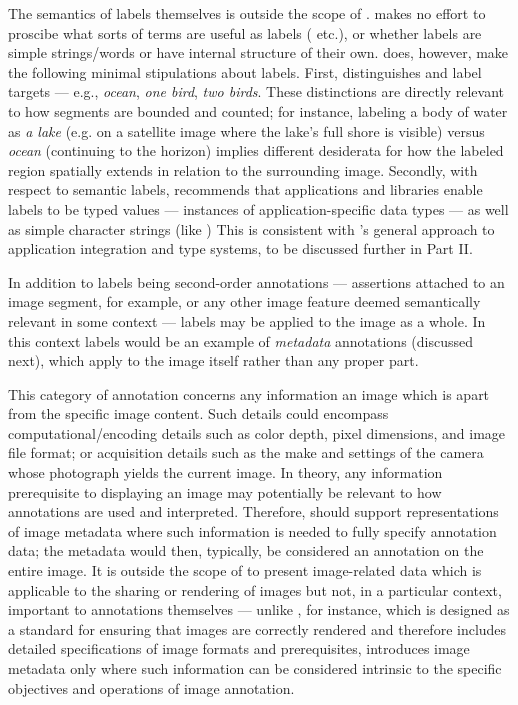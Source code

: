 {\begin{description}
The semantics of labels themselves is outside 
the scope of \AXFI{}.  \lAXFI{} makes no effort 
to proscibe what sorts of terms are useful 
as labels (   
 etc.), or whether labels are 
simple strings/words or have internal structure 
of their own.  \lAXFI{} does, however, 
make the following minimal stipulations about 
labels.  First, \AXFI{} distinguishes 
  and  label 
targets --- e.g., \textit{ocean}, \textit{one bird}, 
\textit{two birds}.  These distinctions are 
directly relevant to how segments are bounded and 
counted; for instance, labeling a body of water 
as \textit{a lake} (e.g. on a satellite image where 
the lake's full shore is visible) versus \textit{ocean} 
(continuing to the horizon) implies different 
desiderata for how the labeled region spatially extends 
in relation to the surrounding image.  Secondly, 
with respect to semantic labels, \AXFI{} recommends 
that applications and libraries enable 
labels to be typed values --- instances of 
application-specific data types --- as well 
as simple character strings (like )  
This is consistent with \AXFI{}'s general 
approach to application integration and 
type systems, to be discussed further in 
Part II. 

In addition to labels being second-order annotations 
--- assertions attached to an image segment, 
for example, or any other image feature deemed 
semantically relevant in some context --- labels 
may be applied to the image as a whole.  In this
context labels would be an example of 
\textit{metadata} annotations (discussed next), 
which apply to the image itself 
rather than any proper part. 


\item[Image Metadata]   This category 
of annotation concerns any information 
 an image which is apart from 
the specific image content.  Such details could encompass 
computational/encoding details such 
as color depth, pixel dimensions, and image 
file format; or acquisition details 
such as the make and settings of the camera 
whose photograph yields the current image.  
In theory, any information prerequisite to 
displaying an image may potentially 
be relevant to how annotations are 
used and interpreted.  Therefore, 
\AXFI{} should support representations of 
image metadata where such information is needed 
to fully specify annotation data; the metadata 
would then, typically, be considered an 
annotation on the entire image.  It is 
outside the scope of \AXFI{} to present 
image-related data which is applicable  
to the sharing or rendering of images but 
not, in a particular context, important to 
annotations themselves --- unlike \DICOM{}, 
for instance, which is designed as a 
standard for ensuring that images are correctly 
rendered and therefore includes detailed 
specifications of image formats and 
prerequisites, \AXFI{} introduces 
image metadata only where such information 
can be considered intrinsic to the 
specific objectives and operations of image 
annotation.  


\end{description}}
